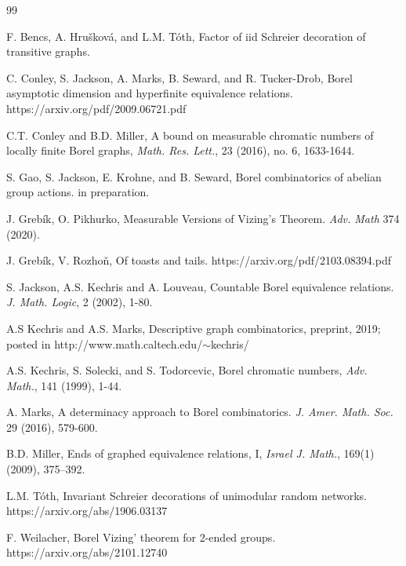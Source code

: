 \documentclass[12pt]{article}
\newcommand{\0}{\varnothing}
\begin{document}
\begin{thebibliography}{99}

 F. Bencs, A. Hru\v{s}kov\'{a}, and L.M. T\'{o}th, Factor of iid Schreier decoration of transitive graphs.

 C. Conley, S. Jackson, A. Marks, B. Seward, and R. Tucker-Drob, Borel asymptotic dimension and hyperfinite equivalence relations. https://arxiv.org/pdf/2009.06721.pdf

 C.T. Conley and B.D. Miller, A bound on measurable chromatic numbers of locally finite Borel graphs, \textit{Math. Res. Lett.}, 23 (2016), no. 6, 1633-1644.

 S. Gao, S. Jackson, E. Krohne, and B. Seward, Borel combinatorics of abelian group actions. in preparation.

 J. Greb\'{i}k, O. Pikhurko, Measurable Versions of Vizing's Theorem. \textit{Adv. Math} 374 (2020).

 J. Greb\'{i}k, V. Rozho\v{n}, Of toasts and tails. \textnormal{https://arxiv.org/pdf/2103.08394.pdf}

 S. Jackson, A.S. Kechris and A. Louveau, Countable Borel equivalence relations. \textit{J. Math. Logic}, 2 (2002), 1-80.

 A.S Kechris and A.S. Marks, Descriptive graph combinatorics, preprint, 2019; posted in \textnormal{http://www.math.caltech.edu/$\sim$kechris/}

 A.S. Kechris, S. Solecki, and S. Todorcevic, Borel chromatic numbers, \textit{Adv. Math.}, 141 (1999), 1-44.

 A. Marks, A determinacy approach to Borel combinatorics. \textit{J. Amer. Math. Soc.} 29 (2016), 579-600.

 B.D. Miller, Ends of graphed equivalence relations, I, \textit{Israel J.
Math.}, 169(1) (2009), 375–392.

 L.M. T\'{o}th, Invariant Schreier decorations of unimodular random networks. https://arxiv.org/abs/1906.03137

 F. Weilacher, Borel Vizing' theorem for 2-ended groups. https://arxiv.org/abs/2101.12740



\end{thebibliography}
\end{document}
